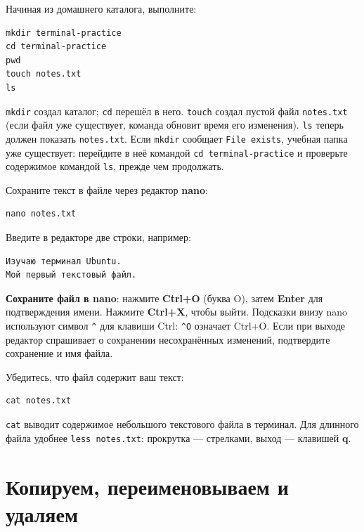 Начиная из домашнего каталога, выполните:

\begin{verbatim}
mkdir terminal-practice
cd terminal-practice
pwd
touch notes.txt
ls
\end{verbatim}

\texttt{mkdir} создал каталог; \texttt{cd} перешёл в него.
\texttt{touch} создал пустой файл \texttt{notes.txt} (если файл уже
существует, команда обновит время его изменения). \texttt{ls} теперь
должен показать \texttt{notes.txt}. Если \texttt{mkdir} сообщает
\texttt{File\ exists}, учебная папка уже существует: перейдите в неё
командой \texttt{cd\ terminal-practice} и проверьте содержимое командой
\texttt{ls}, прежде чем продолжать.

Сохраните текст в файле через редактор \textbf{nano}:

\begin{verbatim}
nano notes.txt
\end{verbatim}

Введите в редакторе две строки, например:

\begin{verbatim}
Изучаю терминал Ubuntu.
Мой первый текстовый файл.
\end{verbatim}

\textbf{Сохраните файл в nano}: нажмите \textbf{Ctrl+O} (буква O), затем
\textbf{Enter} для подтверждения имени. Нажмите \textbf{Ctrl+X}, чтобы
выйти. Подсказки внизу nano используют символ \texttt{\^{}} для клавиши
Ctrl: \texttt{\^{}O} означает Ctrl+O. Если при выходе редактор
спрашивает о сохранении несохранённых изменений, подтвердите сохранение
и имя файла.

Убедитесь, что файл содержит ваш текст:

\begin{verbatim}
cat notes.txt
\end{verbatim}

\texttt{cat} выводит содержимое небольшого текстового файла в терминал.
Для длинного файла удобнее \texttt{less\ notes.txt}: прокрутка ---
стрелками, выход --- клавишей \textbf{q}.

\hypertarget{ux43aux43eux43fux438ux440ux443ux435ux43c-ux43fux435ux440ux435ux438ux43cux435ux43dux43eux432ux44bux432ux430ux435ux43c-ux438-ux443ux434ux430ux43bux44fux435ux43c}{%
\section{Копируем, переименовываем и
удаляем}\label{ux43aux43eux43fux438ux440ux443ux435ux43c-ux43fux435ux440ux435ux438ux43cux435ux43dux43eux432ux44bux432ux430ux435ux43c-ux438-ux443ux434ux430ux43bux44fux435ux43c}}


